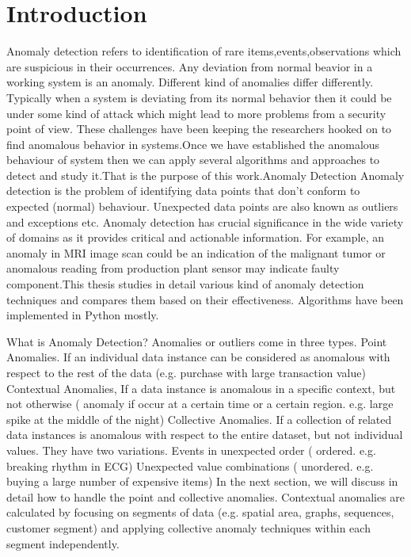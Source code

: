 \chapter{Introduction}
\label{chap:intro}
Anomaly detection refers to  identification of rare items,events,observations which are suspicious in their occurrences. Any deviation from normal beavior in a working system is an anomaly. Different kind of anomalies  differ differently. Typically when a system is deviating from its normal behavior then it could be under some kind of attack which might lead to more problems from a security point of view. These challenges have been keeping the researchers hooked on to find anomalous behavior in systems.Once we have established the anomalous behaviour of system then we can apply several algorithms and approaches to detect and study it.That is the purpose of this work.Anomaly Detection
Anomaly detection is the problem of identifying data points that don't conform to expected (normal) behaviour. Unexpected data points are also known as outliers and exceptions etc. Anomaly detection has crucial significance in the wide variety of domains as it provides critical and actionable information. For example, an anomaly in MRI image scan could be an indication of the malignant tumor or anomalous reading from production plant sensor may indicate faulty component.This thesis studies in detail various kind of anomaly detection techniques and compares them based on their effectiveness. Algorithms have been implemented in Python mostly.

What is Anomaly Detection?
Anomalies or outliers come in three types.
Point Anomalies. If an individual data instance can be considered as anomalous with respect to the rest of the data (e.g. purchase with large transaction value)
Contextual Anomalies, If a data instance is anomalous in a specific context, but not otherwise ( anomaly if occur at a certain time or a certain region. e.g. large spike at the middle of the night)
Collective Anomalies. If a collection of related data instances is anomalous with respect to the entire dataset, but not individual values. They have two variations. 
Events in unexpected order ( ordered. e.g. breaking rhythm in ECG)
Unexpected value combinations ( unordered. e.g. buying a large number of expensive items)
In the next section, we will discuss in detail how to handle the point and collective anomalies. Contextual anomalies are calculated by focusing on segments of data (e.g. spatial area, graphs, sequences, customer segment) and applying collective anomaly techniques within each segment independently.

